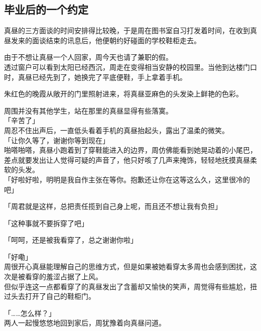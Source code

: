 \subsection{毕业后的一个约定}

真昼的三方面谈的时间安排得比较晚，于是周在图书室自习打发着时间，在收到真昼发来的面谈结束的讯息后，他便朝约好碰面的学校鞋柜走去。

由于不想让真昼一个人回家，周今天也请了兼职的假。\\

透过窗户可以看到太阳已经西沉，周走在变得相当安静的校园里。当他到达楼门口时，真昼已经先到了，她换完了平底便鞋，手上拿着手机。

朱红色的晚霞从敞开的门里照射进来，将真昼亚麻色的头发染上鲜艳的色彩。

周围并没有其他学生，站在那里的真昼显得有些落寞。\\

「辛苦了」\\

周忍不住出声后，一直低头看着手机的真昼抬起头，露出了温柔的微笑。\\

「让你久等了，谢谢你等到现在」\\

啪嗒啪嗒，真昼小跑着到了穿鞋能进入的边界，周仿佛能看到她晃动着的小尾巴，差点就要发出让人觉得可疑的声音了，他只好咳了几声来掩饰，轻轻地抚摸真昼柔软的头发。\\

「好啦好啦，明明是我自作主张在等你。抱歉还让你在这等这么久，这里很冷的吧」

「周君就是这样，总把责任揽到自己身上呢，而且还不想让我有负担」

「这种事就不要拆穿了吧」

「呵呵，还是被我看穿了，总之谢谢你啦」

「好嘞」\\

周很开心真昼能理解自己的思维方式，但是如果被她看穿太多周也会感到困扰，这次是被看穿的羞涩占据了上风。\\

但似乎连这一点都看穿了的真昼发出了含蓄却又愉快的笑声，周觉得有些尴尬，扭过头去打开了自己的鞋柜门。\\

\vspace{2\baselineskip}

「……怎么样？」\\

两人一起慢悠悠地回到家后，周犹豫着向真昼问道。\\

